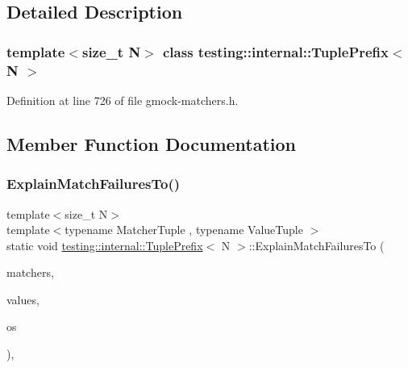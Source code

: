 \subsection{Detailed Description}
\subsubsection*{template$<$size\+\_\+t N$>$\newline
class testing\+::internal\+::\+Tuple\+Prefix$<$ N $>$}



Definition at line 726 of file gmock-\/matchers.\+h.



\subsection{Member Function Documentation}
\mbox{\label{classtesting_1_1internal_1_1TuplePrefix_a0ffd38ce90ae6da645a5655aefac5bb7}} 
\subsubsection{\texorpdfstring{Explain\+Match\+Failures\+To()}{ExplainMatchFailuresTo()}}
{\footnotesize\ttfamily template$<$size\+\_\+t N$>$ \\
template$<$typename Matcher\+Tuple , typename Value\+Tuple $>$ \\
static void \hyperlink{classtesting_1_1internal_1_1TuplePrefix}{testing\+::internal\+::\+Tuple\+Prefix}$<$ N $>$\+::Explain\+Match\+Failures\+To (\begin{DoxyParamCaption}\item[{const \hyperlink{structtesting_1_1internal_1_1MatcherTuple}{Matcher\+Tuple} \&}]{matchers,  }\item[{const Value\+Tuple \&}]{values,  }\item[{\+::std\+::ostream $\ast$}]{os }\end{DoxyParamCaption})\hspace{0.3cm}{\ttfamily [inline]}, {\ttfamily [static]}}



